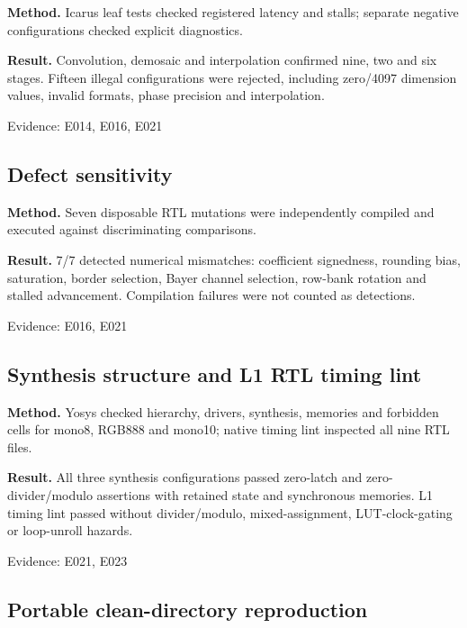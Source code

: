 \documentclass[11pt,a4paper]{article}
\begin{document}
\textbf{Method.} Icarus leaf tests checked registered latency and stalls; separate negative configurations checked explicit diagnostics.

\textbf{Result.} Convolution,\allowbreak{} demosaic and interpolation confirmed nine,\allowbreak{} two and six stages. Fifteen illegal configurations were rejected,\allowbreak{} including zero/\allowbreak{}4097 dimension values,\allowbreak{} invalid formats,\allowbreak{} phase precision and interpolation.

{\small Evidence: E014,\allowbreak{} E016,\allowbreak{} E021}

\subsection{Defect sensitivity}

\textbf{Method.} Seven disposable RTL mutations were independently compiled and executed against discriminating comparisons.

\textbf{Result.} 7/\allowbreak{}7 detected numerical mismatches: coefficient signedness,\allowbreak{} rounding bias,\allowbreak{} saturation,\allowbreak{} border selection,\allowbreak{} Bayer channel selection,\allowbreak{} row-bank rotation and stalled advancement. Compilation failures were not counted as detections.

{\small Evidence: E016,\allowbreak{} E021}

\subsection{Synthesis structure and L1 RTL timing lint}

\textbf{Method.} Yosys checked hierarchy,\allowbreak{} drivers,\allowbreak{} synthesis,\allowbreak{} memories and forbidden cells for mono8,\allowbreak{} RGB888 and mono10; native timing lint inspected all nine RTL files.

\textbf{Result.} All three synthesis configurations passed zero-latch and zero-divider/\allowbreak{}modulo assertions with retained state and synchronous memories. L1 timing lint passed without divider/\allowbreak{}modulo,\allowbreak{} mixed-assignment,\allowbreak{} LUT-clock-gating or loop-unroll hazards.

{\small Evidence: E021,\allowbreak{} E023}

\subsection{Portable clean-directory reproduction}
\end{document}
